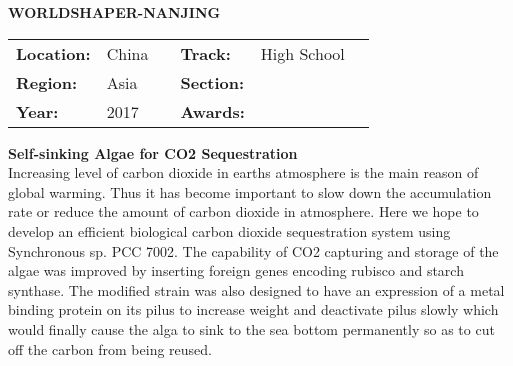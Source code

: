 \textbf{\uppercase{Worldshaper-Nanjing}} \FloatBarrier \begin{table}[h] \begin{tabular}{lp{2.5cm}llll} \textbf{Location:} & China & \multicolumn{1}{|l}{} & \textbf{Track:}   & High School \\ \textbf{Region:}   & Asia   & \multicolumn{1}{|l}{} & \textbf{Section:} &  \\ \textbf{Year:}     & 2017   & \multicolumn{1}{|l}{} & \textbf{Awards:}  & \end{tabular} \end{table} \FloatBarrier \noindent\textbf{Self-sinking Algae for CO2 Sequestration} \vspace{.2cm}\\ 
Increasing level of carbon dioxide in earths atmosphere is the main reason of global warming. Thus it has become important to slow down the accumulation rate or reduce the amount of carbon dioxide in atmosphere. Here we hope to develop an efficient biological carbon dioxide sequestration system using Synchronous sp. PCC 7002. The capability of CO2 capturing and storage of the algae was improved by inserting foreign genes encoding rubisco and starch synthase. The modified strain was also designed to have an expression of a metal binding protein on its pilus to increase weight and deactivate pilus slowly which would finally cause the alga to sink to the sea bottom permanently so as to cut off the carbon from being reused.
\vspace{2cm} $ $
\pagebreak

